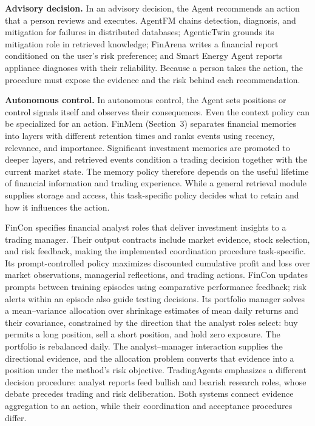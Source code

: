 \documentclass[preprints,article,submit,moreauthors]{Definitions/mdpi}
\begin{document}
\noindent\textbf{Advisory decision.} In an advisory decision, the Agent recommends an action that a person reviews and executes. AgentFM \citep{agentfm2025} chains detection, diagnosis, and mitigation for failures in distributed databases; AgenticTwin \citep{agentictwin2026} grounds its mitigation role in retrieved knowledge; FinArena \citep{finarena2025} writes a financial report conditioned on the user's risk preference; and Smart Energy Agent \citep{smartenergyagent2026} reports appliance diagnoses with their reliability. Because a person takes the action, the procedure must expose the evidence and the risk behind each recommendation.

\noindent\textbf{Autonomous control.} In autonomous control, the Agent sets positions or control signals itself and observes their consequences. Even the context policy can be specialized for an action. FinMem \citep{finmem2023} (Section~3) separates financial memories into layers with different retention times and ranks events using recency, relevance, and importance. Significant investment memories are promoted to deeper layers, and retrieved events condition a trading decision together with the current market state. The memory policy therefore depends on the useful lifetime of financial information and trading experience. While a general retrieval module supplies storage and access, this task-specific policy decides what to retain and how it influences the action.

FinCon \citep{fincon2024} specifies financial analyst roles that deliver investment insights to a trading manager. Their output contracts include market evidence, stock selection, and risk feedback, making the implemented coordination procedure task-specific. Its prompt-controlled policy maximizes discounted cumulative profit and loss over market observations, managerial reflections, and trading actions. FinCon updates prompts between training episodes using comparative performance feedback; risk alerts within an episode also guide testing decisions. Its portfolio manager solves a mean--variance allocation over shrinkage estimates of mean daily returns and their covariance, constrained by the direction that the analyst roles select: buy permits a long position, sell a short position, and hold zero exposure. The portfolio is rebalanced daily. The analyst--manager interaction supplies the directional evidence, and the allocation problem converts that evidence into a position under the method's risk objective. TradingAgents \citep{tradingagents2024} emphasizes a different decision procedure: analyst reports feed bullish and bearish research roles, whose debate precedes trading and risk deliberation. Both systems connect evidence aggregation to an action, while their coordination and acceptance procedures differ.
\end{document}
